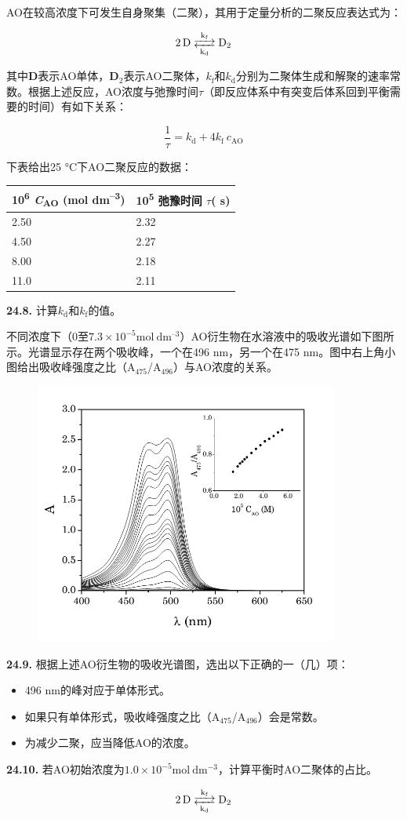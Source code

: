 AO在较高浓度下可发生自身聚集（二聚），其用于定量分析的二聚反应表达式为：

\[\ce{2D <-->[{k_{\mathrm f}}][{k_{\mathrm d}}] D_2 }\]

\noindent 其中\textbf{D}表示AO单体，\textbf{D}\(_2\)表示AO二聚体，$k_{\mathrm f}$和$k_{\mathrm d}$分别为二聚体生成和解聚的速率常数。根据上述反应，AO浓度与弛豫时间$\tau$（即反应体系中有突变后体系回到平衡需要的时间）有如下关系：

\[\frac{1}{\tau} = k_{\mathrm d} + 4k_{\mathrm f}\ c_{\mathrm{AO}}\]

\noindent 下表给出25 °C下AO二聚反应的数据：

\begin{longtable}[]{@{}ll@{}}
    \toprule
    10\textsuperscript{6} \emph{C}\textsubscript{AO} (mol
    dm\textsuperscript{--3}) & 10\textsuperscript{5} 弛豫时间 \emph{$\tau$}(
    s)\tabularnewline
    \midrule
    \endhead
    2.50 & 2.32\tabularnewline
    4.50 & 2.27\tabularnewline
    8.00 & 2.18\tabularnewline
    11.0 & 2.11\tabularnewline
    \bottomrule
\end{longtable}

\noindent\textbf{24.8.}
计算$k_{\mathrm d}$和$k_{\mathrm f}$的值。

不同浓度下（\(0\)至$\mathrm{7.3 \times 10^{-5} mol\ dm^{–3}}$）AO衍生物在水溶液中的吸收光谱如下图所示。光谱显示存在两个吸收峰，一个在496 nm，另一个在475 nm。图中右上角小图给出吸收峰强度之比（A\(_{475}\)/A\(_{496}\)）与AO浓度的关系。

\begin{figure}[h]
	\centering
	\includegraphics[width=10cm]{./pic/t24-2.png}
\end{figure}

\noindent\textbf{24.9.}
根据上述AO衍生物的吸收光谱图，选出以下正确的一（几）项：
\renewcommand{\labelitemi}{$\square$}
\begin{itemize}
    \item 496 nm的峰对应于单体形式。
    \item 如果只有单体形式，吸收峰强度之比（A\(_{475}\)/A\(_{496}\)）会是常数。
    \item 为减少二聚，应当降低AO的浓度。
\end{itemize}
\renewcommand{\labelitemi}{$\bullet$}

\noindent\textbf{24.10.}
若AO初始浓度为$\mathrm{1.0 \times 10^{-5} mol\ dm^{-3}}$，计算平衡时AO二聚体的占比。

\[\ce{2D <-->[{k_{\mathrm f}}][{k_{\mathrm d}}] D_2 }\]
